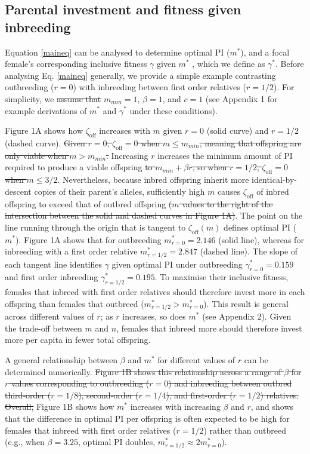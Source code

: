 \documentclass[12pt]{article}
\begin{document}
\subsection*{Parental investment and fitness given inbreeding}

Equation \ref{maineq} can be analysed to determine optimal PI ($m^{*}$), and a focal female's corresponding inclusive fitness $\gamma$ given $m^{*}$ \cite[][]{Kuijper2012}, which we define as $\gamma^{*}$. Before analysing Eq. \ref{maineq} generally, we provide a simple example contrasting outbreeding ($r=0$) with inbreeding between first order relatives ($r=1/2$). For simplicity, we {\color{red}\st{assume that}} {\color{blue}{set parameter values equal to}} $m_{min}=1$, $\beta=1$, and $c=1$ (see Appendix 1 for example derivations of $m^{*}$ and $\gamma^{*}$ under these conditions).

Figure 1A shows how $\zeta_{\textrm{off}}$ increases with $m$ given $r=0$ (solid curve) and $r=1/2$ (dashed curve). {\color{red}\st{Given $r=0$, $\zeta_{\textrm{off}}=0$ when $m \leq m_{min}$, meaning that offspring are only viable when $m>m_{min}$.}} Increasing $r$ increases the minimum amount of PI required to produce a viable offspring {\color{red}\st{to $m_{min}+\beta r$, so when $r=1/2$, $\zeta_{\textrm{off}}=0$ when $m \leq 3/2$}}. Nevertheless, because inbred offspring inherit more identical-by-descent copies of their parent's alleles, sufficiently high $m$ causes $\zeta_{\textrm{off}}$ of inbred offspring to exceed that of outbred offspring {\color{red}\st{($m$ values to the right of the intersection between the solid and dashed curves in Figure 1A)}}. The point on the line running through the origin that is tangent to $\zeta_{\textrm{off}}(m)$ defines optimal PI ($m^{*}$). Figure 1A shows that for outbreeding $m^{*}_{r=0}=2.146$ (solid line), whereas for inbreeding with a first order relative $m^{*}_{r=1/2}=2.847$ (dashed line). The slope of each tangent line identifies $\gamma$ given optimal PI under outbreeding $\gamma^{*}_{r=0}=0.159$ and first order inbreeding $\gamma^{*}_{r=1/2}=0.195$. To maximise their inclusive fitness, females that inbreed with first order relatives should therefore invest more in each offspring than females that outbreed ($m^{*}_{r=1/2}>m^{*}_{r=0}$). This result is general across different values of $r$; as $r$ increases, so does $m^{*}$ (see Appendix 2). Given the trade-off between $m$ and $n$, females that inbreed more should therefore invest more per capita in fewer total offspring. 

A general relationship between $\beta$ and $m^{*}$ for different values of $r$ can be determined numerically. {\color{red}\st{Figure 1B shows this relationship across a range of $\beta$ for $r$ values corresponding to outbreeding ($r=0$) and inbreeding between outbred third-order ($r=1/8$), second-order ($r=1/4$), and first-order ($r=1/2$) relatives. Overall,}} Figure 1B shows how $m^{*}$ increases with increasing $\beta$ and $r$, and shows that the difference in optimal PI per offspring is often expected to be high for females that inbreed with first order relatives {\color{blue}($r=1/2$)} rather than outbreed (e.g., when $\beta=3.25$, optimal PI doubles, $m^{*}_{r=1/2} \approx 2m^{*}_{r=0}$).
\end{document}
